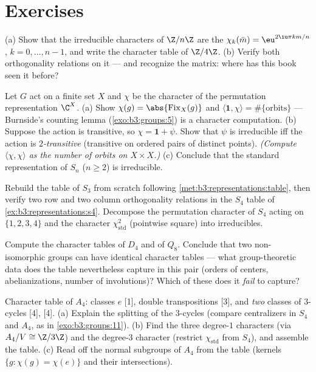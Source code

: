 \section{Exercises}

\begin{exercise}[$\star$]\label{exo:b3:representations:1}
(a) Show that the irreducible characters of $\Z/n\Z$ are the
$\chi_k(\bar m) = \eu^{2\iu\pi km/n}$, $k = 0, \dots, n-1$, and
write the character table of $\Z/4\Z$.
(b) Verify both orthogonality relations on it --- and recognize
the matrix: where has this book seen it before?
\end{exercise}

\begin{exercise}[$\star$]\label{exo:b3:representations:2}
Let $G$ act on a finite set $X$ and $\chi$ be the character of
the permutation representation $\C^X$.
(a) Show $\chi(g) = \abs{\operatorname{Fix}_X(g)}$ and
$\langle \mathbf 1, \chi\rangle = \#\{\text{orbits}\}$ ---
Burnside's counting lemma (\cref{exo:b3:groups:5}) is a character
computation.
(b) Suppose the action is transitive, so $\chi = \mathbf 1 +
\psi$. Show that $\psi$ is irreducible iff the action is
\emph{$2$-transitive} (transitive on ordered pairs of distinct
points). \emph{(Compute $\langle\chi,\chi\rangle$ as the number
of orbits on $X \times X$.)}
(c) Conclude that the standard representation of $S_n$ ($n \geq
2$) is irreducible.
\end{exercise}

\begin{exercise}[$\star$]\label{exo:b3:representations:3}
Rebuild the table of $S_3$ from scratch following
\cref{met:b3:representations:table}, then verify two row and two
column orthogonality relations in the $S_4$ table of
\cref{ex:b3:representations:s4}. Decompose the permutation
character of $S_4$ acting on $\{1,2,3,4\}$ and the character
$\chi_{\mathrm{std}}^2$ (pointwise square) into irreducibles.
\end{exercise}

\begin{exercise}[$\star\star$]\label{exo:b3:representations:4}
Compute the character tables of $D_4$ and of $Q_8$. Conclude
that two non-isomorphic groups can have identical character
tables --- what group-theoretic data does the table nevertheless
capture in this pair (orders of centers, abelianizations,
number of involutions)? Which of these does it \emph{fail} to
capture?
\end{exercise}

\begin{exercise}[$\star\star$]\label{exo:b3:representations:5}
Character table of $A_4$: classes $e$ [1], double transpositions
[3], and \emph{two} classes of $3$-cycles [4], [4].
(a) Explain the splitting of the $3$-cycles (compare centralizers
in $S_4$ and $A_4$, as in \cref{exo:b3:groups:11}).
(b) Find the three degree-$1$ characters (via $A_4/V \cong
\Z/3\Z$) and the degree-$3$ character (restrict
$\chi_{\mathrm{std}}$ from $S_4$), and assemble the table.
(c) Read off the normal subgroups of $A_4$ from the table
(kernels $\{g : \chi(g) = \chi(e)\}$ and their intersections).
\end{exercise}


